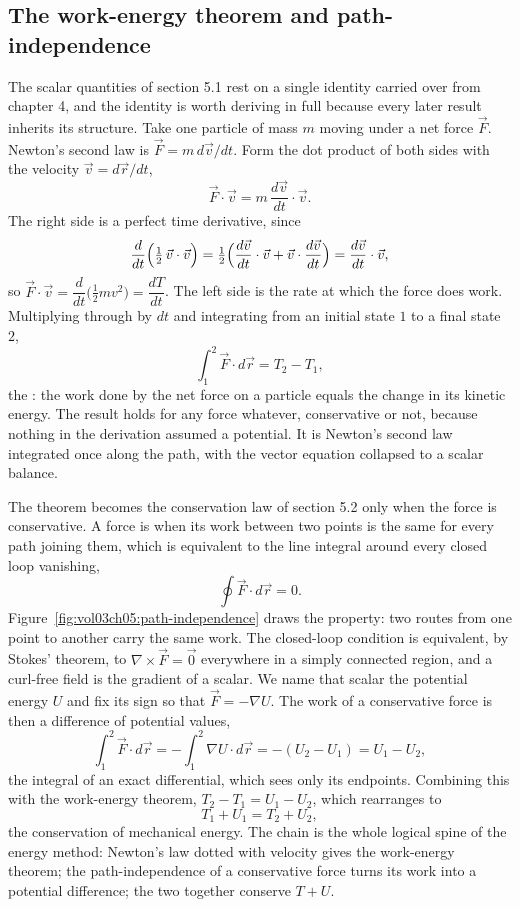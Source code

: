 \subsection{The work-energy theorem and path-independence}

The scalar quantities of section 5.1 rest on a single identity carried
over from chapter 4, and the identity is worth deriving in full because
every later result inherits its structure. Take one particle of mass $m$
moving under a net force $\vec{F}$. Newton's second law is $\vec{F} =
m\,d\vec{v}/dt$. Form the dot product of both sides with the velocity
$\vec{v} = d\vec{r}/dt$,
\[
\vec{F}\cdot\vec{v} = m\,\frac{d\vec{v}}{dt}\cdot\vec{v}.
\]
The right side is a perfect time derivative, since
\[
\frac{d}{dt}\Bigl(\tfrac12\,\vec{v}\cdot\vec{v}\Bigr)
= \tfrac12\Bigl(\frac{d\vec{v}}{dt}\cdot\vec{v}
+ \vec{v}\cdot\frac{d\vec{v}}{dt}\Bigr)
= \frac{d\vec{v}}{dt}\cdot\vec{v},
\]
so $\vec{F}\cdot\vec{v} = \dfrac{d}{dt}\bigl(\tfrac12 m v^2\bigr) =
\dfrac{dT}{dt}$. The left side is the rate at which the force does work.
Multiplying through by $dt$ and integrating from an initial state $1$ to
a final state $2$,
\[
\int_1^2 \vec{F}\cdot d\vec{r} = T_2 - T_1,
\]
the : the work done by the net force on a
particle equals the change in its kinetic energy. The result holds for
any force whatever, conservative or not, because nothing in the
derivation assumed a potential. It is Newton's second law integrated
once along the path, with the vector equation collapsed to a scalar
balance.

The theorem becomes the conservation law of section 5.2 only when the
force is conservative. A force is  when its work
between two points is the same for every path joining them, which is
equivalent to the line integral around every closed loop vanishing,
\[
\oint \vec{F}\cdot d\vec{r} = 0.
\]
Figure~\ref{fig:vol03ch05:path-independence} draws the property: two
routes from one point to another carry the same work. The closed-loop
condition is equivalent, by Stokes' theorem, to $\nabla\times\vec{F} =
\vec{0}$ everywhere in a simply connected region, and a curl-free field
is the gradient of a scalar. We name that scalar the potential energy
$U$ and fix its sign so that $\vec{F} = -\nabla U$. The work of a
conservative force is then a difference of potential values,
\[
\int_1^2 \vec{F}\cdot d\vec{r}
= -\int_1^2 \nabla U\cdot d\vec{r}
= -(U_2 - U_1) = U_1 - U_2,
\]
the integral of an exact differential, which sees only its endpoints.
Combining this with the work-energy theorem, $T_2 - T_1 = U_1 - U_2$,
which rearranges to
\[
T_1 + U_1 = T_2 + U_2,
\]
the conservation of mechanical energy. The chain is the whole logical
spine of the energy method: Newton's law dotted with velocity gives the
work-energy theorem; the path-independence of a conservative force turns
its work into a potential difference; the two together conserve $T+U$.

